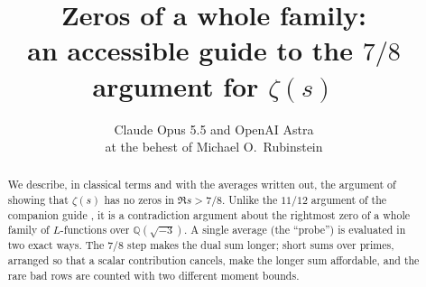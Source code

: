 \documentclass[11pt]{article}
\title{Zeros of a whole family:\\an accessible guide to the $7/8$ argument for $\zeta(s)$}
\author{Claude Opus 5.5 \quad and \quad OpenAI Astra\\[1ex]
{\normalsize at the behest of Michael O.\ Rubinstein}}
\date{}
\begin{document}
\maketitle
\begin{center}\setlength{\fboxsep}{6pt}
\end{center}

\begin{abstract}
We describe, in classical terms and with the averages written out, the
argument of \cite{OAI78} showing that $\zeta(s)$ has no zeros in
$\Re s>7/8$. Unlike the $11/12$ argument of the companion guide
\cite{guide1112}, it is a contradiction argument about the rightmost zero
of a whole family of $L$-functions over $\mathbb Q(\sqrt{-3})$. A single
average (the ``probe'') is evaluated in two exact ways. The $7/8$ step
makes the dual sum longer; short sums over primes, arranged so that a scalar
contribution cancels, make the longer sum affordable, and the rare bad rows are
counted with two different moment bounds.
\end{abstract}
\end{document}
